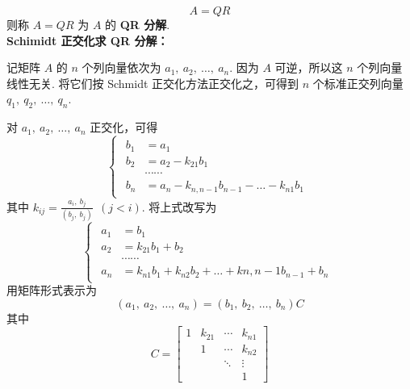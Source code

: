             \begin{equation*}
                A = QR
            \end{equation*}
            则称 $A = QR$ 为 $A$ 的 \textbf{QR 分解}.
            \\
            \textbf{Schimidt 正交化求 QR 分解：}
            \par 记矩阵 $A$ 的 $n$ 个列向量依次为 $a_1, \ a_2, \ \dots, \ a_n$. 因为 $A$ 可逆，所以这 $n$ 个列向量线性无关. 将它们按 Schmidt 正交化方法正交化之，可得到 $n$ 个标准正交列向量 $q_1, \ q_2, \ \dots, \ q_n$.
            \par 对 $a_1, \ a_2, \ \dots, \ a_n$ 正交化，可得
            \begin{equation*}
                \begin{cases*}
                    \begin{aligned}
                        b_1 &= a_1 \\ b_2 &= a_2 - k_{21}b_1 \\ &\cdots \cdots \\ b_n &= a_n - k_{n,n-1}b_{n-1} - \dots - k_{n1}b_1
                    \end{aligned}
                \end{cases*}
            \end{equation*}
            其中 $k_{ij} = \frac{a_i, \ b_j}{(b_j, \ b_j)} \ \ (j < i)$. 将上式改写为
            \begin{equation*}
                \begin{cases*}
                    \begin{aligned}
                        a_1 &= b_1 \\ a_2 &= k_{21}b_1 + b_2 \\ &\cdots \cdots \\ a_n &= k_{n1}b_1 + k_{n2}b_2 + \dots + k{n,n-1}b_{n-1} + b_n
                    \end{aligned}
                \end{cases*}
            \end{equation*}
            用矩阵形式表示为 
            \begin{equation*}
                (a_1, \ a_2, \ \dots, \ a_n) = (b_1, \ b_2, \ \dots, \ b_n)C
            \end{equation*}
            其中
            \begin{equation*}
                C = \begin{bmatrix}
                    1 & k_{21} & \cdots & k_{n1} \\ & 1 & \cdots & k_{n2} \\ & & \ddots & \vdots \\ & & & 1
                \end{bmatrix}
            \end{equation*}
